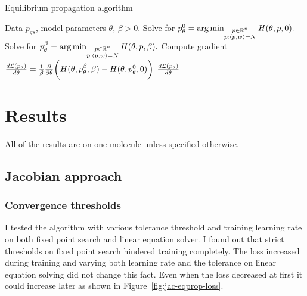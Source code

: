 \documentclass[a4paper,10pt]{report}
\begin{document}
\begin{algorithm}[H]
\caption{Equilibrium propagation algorithm}
\begin{algorithmic}[1]
\Require Data $p_{gs}$, model parameters $\theta$, $\beta>0$.
\State  Solve for $p_\theta^0  = \operatorname*{arg\,min}_{\substack{p \in \mathbb{R}^n \\ p: \langle p, w \rangle=N }} H(\theta, p, 0).$
\State Solve for $p_\theta^\beta  = \operatorname*{arg\,min}_{\substack{p \in \mathbb{R}^n \\ p: \langle p, w \rangle=N }} H(\theta, p, \beta).$
\State Compute gradient $\frac{d\mathcal{L}(p_\theta)}{d \theta} = \frac{1}{\beta} \frac{\partial }{\partial \theta} \bigg(H(\theta, p_\theta^\beta,\beta) - H(\theta, p_\theta^0, 0)\bigg)$
\State \Return $\frac{d\mathcal{L}(p_\theta)}{d \theta}$
\end{algorithmic}
\end{algorithm}


\section{Results}
All of the results are on one molecule unless specified otherwise.

\subsection{Jacobian approach}

\subsubsection{Convergence thresholds}
 I tested the algorithm with various tolerance threshold and training learning rate on both fixed point search and linear equation solver.
I found out that strict thresholds on fixed point search hindered training completely. The loss increased during training and varying both learning rate and the tolerance on linear equation solving did not change this fact. Even when the loss decreased at first it could increase later as shown in Figure~\ref{fig:jac-eqprop-loss}.
\end{document}
